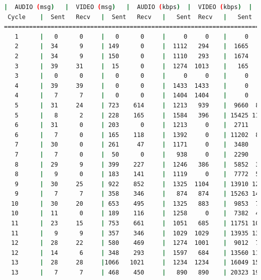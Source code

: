 \begin{lstlisting}[language=bash,basicstyle=\ttfamily\scriptsize]
          |  AUDIO (msg)   |  VIDEO (msg)   |  AUDIO (kbps)  |  VIDEO (kbps)  |   CPU (%)
 Cycle    |  Sent   Recv   |  Sent   Recv   |   Sent  Recv   |   Sent  Recv   | Program System
============================================================================================
   1      |   0      0     |   0      0     |     0     0    |     0     0    |   0      0
   2      |  34      9     | 149      0     |  1112   294    |  1665     0    |  18     62
   2      |  34      9     | 150      0     |  1110   293    |  1674     0    |  18     63
   3      |  39     31     |  15      0     |  1274  1013    |   165     0    |  41     71
   3      |   0      0     |   0      0     |     0     0    |     0     0    |  34     72
   4      |  39     39     |   0      0     |  1433  1433    |     0     0    |  47     76
   4      |   7      7     |   0      0     |  1404  1404    |     0     0    |  30     75
   5      |  31     24     | 723    614     |  1213   939    |  9660  8202    |  32     74
   5      |   8      2     | 228    165     |  1584   396    | 15425 11159    |  36     71
   6      |  31      0     | 203      0     |  1213     0    |  2711     0    |  38     65
   6      |   7      0     | 165    118     |  1392     0    | 11202  8020    |  48     68
   7      |  30      0     | 261     47     |  1171     0    |  3480   624    |  34     68
   7      |   7      0     |  50      0     |   938     0    |  2290     0    |  40     69
   8      |  29      9     | 399    227     |  1246   386    |  5852  3331    |  43     69
   8      |   9      0     | 183    141     |  1119     0    |  7772  5986    |  26     67
   9      |  30     25     | 922    852     |  1325  1104    | 13910 12858    |  55     74
   9      |   7      7     | 358    346     |   874   874    | 15263 14742    |  34     72
  10      |  30     20     | 653    495     |  1325   883    |  9853  7469    |  35     69
  10      |  11      0     | 189    116     |  1258     0    |  7382  4535    |  24     69
  11      |  23     15     | 753    661     |  1051   685    | 11751 10314    |  22     67
  11      |   9      9     | 357    346     |  1029  1029    | 13935 13512    |  24     71
  12      |  28     22     | 580    469     |  1274  1001    |  9012  7286    |  27     68
  12      |  14      6     | 348    293     |  1597   684    | 13560 11422    |  45     67
  13      |  28     28     |1066   1021     |  1234  1234    | 16049 15371    |  24     72
  13      |   7      7     | 468    450     |   890   890    | 20323 19540    |  27     70

\end{lstlisting}
